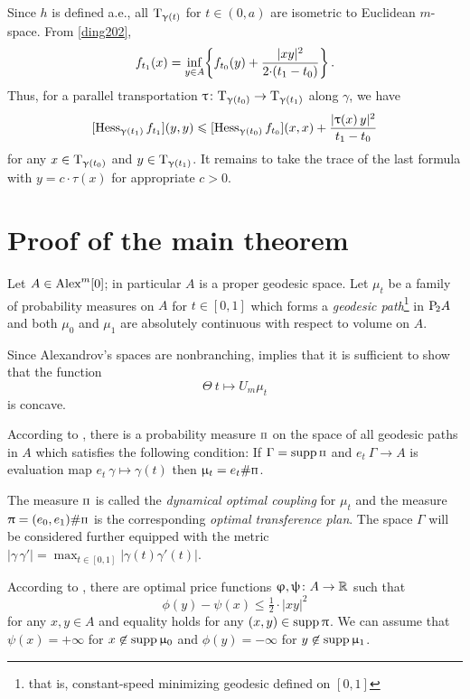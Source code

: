 \documentclass[oneside,a4paper]{article}
\begin{document}
Since $h$ is defined a.e., all $\text{\rm T}_{\upgamma(t)}$ for $t\in(0,a)$ are isometric to Euclidean $m$-space.
From \ref{ding202},
$$f_{t_1}(x)=\inf_{y\in A}\!\left\{f_{t_0}(y)+\frac{|x y|^2}{2{\cdot}(t_1-t_0)}\right\}.$$
Thus, for a parallel transportation $\uptau\colon\text{\rm T}_{\upgamma(t_0)}\to \text{\rm T}_{\upgamma(t_1)}$ along $\gamma$,
we have 
$$[\operatorname{Hess}_{\upgamma(t_1)}f_{t_1}](y,y)
\leqslant
[\operatorname{Hess}_{\upgamma(t_0)}f_{t_0}](x,x)
+\frac{|\uptau (x)\,y|^2}{t_1-t_0}$$
for any $x\in\text{\rm T}_{\upgamma(t_0)}$ and $y\in\text{\rm T}_{\upgamma(t_1)}$.
It remains to take the trace of the last formula with $y=c{\cdot}\tau(x)$ for appropriate $c>0$.
\qeds















\section{Proof of the main theorem}

Let $A\in\CBB m 0$; in particular $A$ is a proper geodesic space.
Let $\mu_t$ be a family of probability measures on $A$ for $t\in[0,1]$ which forms a \emph{geodesic path}\footnote{that is, constant-speed minimizing geodesic defined on $[0,1]$} in $\mathrm {P}_{\!2} A$ and both $\mu_0$ and $\mu_1$ are absolutely continuous with respect to volume on $A$.

Since Alexandrov's spaces are nonbranching,
\cite[30.32]{villani} implies that
it is sufficient to show that the function 
$$\Theta\:t\mapsto U_m\mu_t$$ 
is concave.

\def\Pii{\text{\scriptsize $\Pi$}}

According to \cite[7.22]{villani}, there is a probability measure $\Pii$ on the space of all geodesic paths in $A$ which satisfies the following condition:
If $\Gamma=\supp\Pii$ and $e_t\:\Gamma\to A$ is evaluation map  
$e_t\:\gamma\mapsto\gamma(t)$ then $\mu_t=e_t\#\Pii$.

The measure $\Pii$ is called the  \emph{dynamical optimal coupling} for $\mu_t$ and the measure $\pi=(e_0,e_1)\#\Pii$ is the corresponding \emph{optimal transference plan}.
The space $\Gamma$ will be considered further equipped with the metric $|\gamma\,\gamma'|=\max_{t\in[0,1]}|\gamma(t)\gamma'(t)|$.

According to \cite[5.10]{villani}, there are optimal price functions
 $\upvarphi,\uppsi\colon A\to\mathbb{R}$ such that
$$\phi(y)-\psi(x)\le\tfrac12{\cdot}|x y|^2$$
for any $x,y\in A$ 
and equality holds for any $(x,y)\in\mathop{\rm supp}\nolimits\uppi$.
We can assume that $\psi(x)=+\infty$ for $x\not\in\mathop{\rm supp}\nolimits\upmu_0$ and $\phi(y)=-\infty$ for $y\not\in\mathop{\rm supp}\nolimits\upmu_1$.
\end{document}
